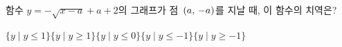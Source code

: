 \hspace*{2mm}\begin{minipage}[t]{\dimexpr\linewidth-2mm\relax}\vspace{0pt}
함수 $y=-\sqrt{x-a}+a+2$의 그래프가 점~$(a,\mkern3mu -a)$를 지날 때, 이 함수의 치역은? 
\begin{choices32}{$\{y\mid y\le 1\}$}{$\{y\mid y\ge 1\}$}{$\{y\mid y\le 0\}$}{$\{y\mid y\le -1\}$}{$\{y\mid y\ge -1\}$}\end{choices32}\end{minipage}
